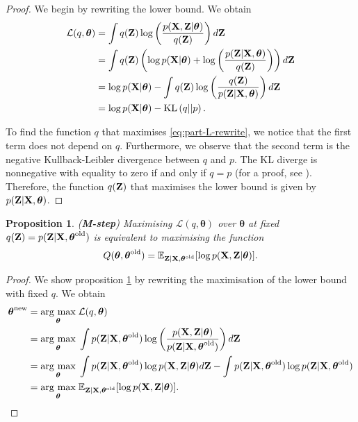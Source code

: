 \documentclass[11pt]{article}
\numberwithin{equation}{section}
\newcommand{\argmax}[1]{\underset{#1}{\operatorname{arg}\,\operatorname{max}}\;}
\newcommand{\KL}[2]{\text{KL}\left(#1 \vert\vert #2\right)}
\newcommand{\X}{{\bf X}}
\newcommand{\Z}{{\bf Z}}
\newtheorem{proposition}{Proposition}[section]
\begin{document}
\begin{proof}
	We begin by rewriting the lower bound. We obtain
	\begin{align}
		\mathcal{L}(q, \boldsymbol\theta) &= \int q(\Z)\log\left(\frac{p(\X, \Z \vert \boldsymbol\theta)}{q(\Z)}\right) d{\bf Z}\\
		&= \int q(\Z) \left(\log p(\X\vert\boldsymbol\theta) + \log\left( \frac{p(\Z \vert \X, \boldsymbol\theta)}{q(\Z)} \right) \right) d\Z\\
		&= \log p(\X \vert \boldsymbol{\theta}) - \int q(\Z) \log\left(\frac{q(\Z)}{p(\Z \vert \X, \boldsymbol\theta)}\right) d\Z\\
		&= \log p(\X \vert \boldsymbol\theta) - \KL{q}{p}. \label{eq:part-L-rewrite}
	\end{align}
	
	To find the function $q$ that maximises \eqref{eq:part-L-rewrite}, we notice that the first term does not depend on $q$. Furthermore, we observe that the second term is the negative Kullback-Leibler divergence between $q$ and $p$. The KL diverge is nonnegative with equality to zero if and only if $q=p$   (for a proof, see \cite{pml1Book}). Therefore, the function $q(\Z)$ that maximises the lower bound is given by $p(\Z \vert \X, \boldsymbol\theta)$.
\end{proof}

\begin{proposition}\label{prop:m-step}
	(\textbf{M-step}) Maximising $\mathcal{L}(q, \boldsymbol{\theta})$ over $\boldsymbol{\theta}$ at fixed $q({\bf Z}) = p({\bf Z} \vert {\bf X}, \boldsymbol\theta^\text{old})$ is equivalent to maximising the function
	\begin{equation}
		Q(\boldsymbol{\theta}, \boldsymbol{\theta}^\text{old}) = \mathbb{E}_{{\bf Z}\vert {\bf X}, \boldsymbol{\theta}^\text{old}}[\log p({\bf X}, {\bf Z}\vert \boldsymbol\theta)].
	\end{equation}
\end{proposition}

\begin{proof}
	We show proposition \ref{prop:m-step} by rewriting the maximisation of the lower bound with fixed $q$. We obtain
	\begin{align}
		\boldsymbol{\theta}^\text{new} &= \argmax{\boldsymbol\theta} \mathcal{L}(q, \boldsymbol\theta)\\
		&= \argmax{\boldsymbol{\theta}} \int p(\Z \vert \X, \boldsymbol{\theta}^\text{old}) \log\left(\frac{p(\X, \Z \vert \boldsymbol\theta)}{p(\Z \vert \X, \boldsymbol\theta^\text{old})}\right) d\Z\\
		&= \argmax{\boldsymbol{\theta}} \int p(\Z \vert \X, \boldsymbol{\theta} ^\text{old}) \log p(\X, \Z \vert \boldsymbol\theta) d\Z - \int p(\Z \vert \X, \boldsymbol{\theta}^\text{old}) \log p(\Z \vert \X, \boldsymbol{\theta}^\text{old})\\
		&= \argmax{\boldsymbol{\theta}} \mathbb{E}_{{\bf Z}\vert {\bf X}, \boldsymbol{\theta}^\text{old}}[\log p({\bf X}, {\bf Z}\vert \boldsymbol\theta)].
	\end{align}
\end{proof}
\end{document}
